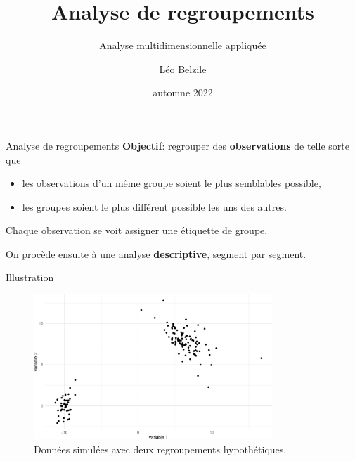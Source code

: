 \documentclass[
  ignorenonframetext,
]{beamer}
\title{Analyse de regroupements}
\subtitle{Analyse multidimensionnelle appliquée}
\author{Léo Belzile}
\date{automne 2022}
\institute{HEC Montréal}
\providecommand{\tightlist}{%
  \setlength{\itemsep}{0pt}\setlength{\parskip}{0pt}}\usepackage{longtable,booktabs,array}
\begin{document}
\frame{\titlepage}
\ifdefined\Shaded\renewenvironment{Shaded}{\begin{tcolorbox}[breakable, sharp corners, boxrule=0pt, enhanced, interior hidden, borderline west={3pt}{0pt}{shadecolor}, frame hidden]}{\end{tcolorbox}}\fi

\begin{frame}{Analyse de regroupements}
\protect\hypertarget{analyse-de-regroupements}{}
\textbf{Objectif}: regrouper des \textbf{observations} de telle sorte
que

\begin{itemize}
\tightlist
\item
  les observations d'un même groupe soient le plus semblables possible,
\item
  les groupes soient le plus différent possible les uns des autres.
\end{itemize}

Chaque observation se voit assigner une étiquette de groupe.

On procède ensuite à une analyse \textbf{descriptive}, segment par
segment.
\end{frame}

\begin{frame}{Illustration}
\protect\hypertarget{illustration}{}
\begin{figure}

{\centering \includegraphics[width=0.8\textwidth,height=\textheight]{MATH60602-diapos11_files/figure-beamer/fig-regroupements-bidons-1.pdf}

}

\caption{\label{fig-regroupements-bidons}Données simulées avec deux
regroupements hypothétiques.}

\end{figure}
\end{frame}
\end{document}
